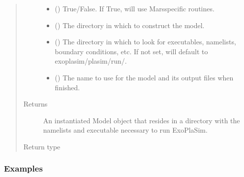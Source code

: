 \documentclass[letterpaper,10pt,english]{sphinxmanual}
\begin{document}
\begin{fulllineitems}
\begin{quote}
\begin{description}
\begin{itemize}
\item {} 
 (\sphinxstyleliteralemphasis{\sphinxupquote{, }}) \textendash{} True/False. If True, will use Mars\sphinxhyphen{}specific routines.

\item {} 
 (\sphinxstyleliteralemphasis{\sphinxupquote{, }}) \textendash{} The directory in which to construct the model.

\item {} 
 (\sphinxstyleliteralemphasis{\sphinxupquote{, }}) \textendash{} The directory in which to look for executables, namelists,
boundary conditions, etc. If not set, will default to exoplasim/plasim/run/.

\item {} 
 (\sphinxstyleliteralemphasis{\sphinxupquote{, }}) \textendash{} The name to use for the model and its output files when finished.

\end{itemize}

\item[{Returns}] \leavevmode
An instantiated Model object that resides in a directory with the namelists
and executable necessary to run ExoPlaSim.

\item[{Return type}] \leavevmode
{\hyperref[\detokenize{source/exoplasim:exoplasim.Model}]{}}

\end{description}\end{quote}
\subsubsection*{Examples}


\end{fulllineitems}
\end{document}
